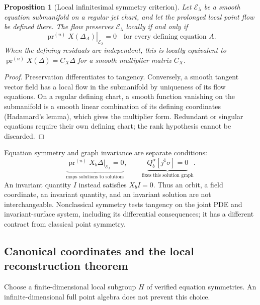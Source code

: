 \documentclass[11pt]{article}
\newtheorem{proposition}[theorem]{Proposition}
\theoremstyle{definition}
\newcommand{\pr}{\operatorname{pr}}
\begin{document}
\begin{proposition}[Local infinitesimal symmetry criterion]
\label{prop:infinitesimal-core}
Let $\mathcal E_\lambda$ be a smooth equation submanifold on a regular jet
chart, and let the prolonged local point flow be defined there. The flow
preserves $\mathcal E_\lambda$ locally if and only if
\begin{equation}
 \left.\pr^{(n)}X(\Delta_A)\right|_{\mathcal E_\lambda}=0
 \quad\text{for every defining equation }A.
 \label{eq:determining}
\end{equation}
When the defining residuals are independent, this is locally equivalent to
$\pr^{(n)}X(\Delta)=C_X\Delta$ for a smooth multiplier matrix $C_X$.
\end{proposition}
\begin{proof}
Preservation differentiates to tangency. Conversely, a smooth tangent vector
field has a local flow in the submanifold by uniqueness of its flow equations.
On a regular defining chart, a smooth function vanishing on the submanifold
is a smooth linear combination of its defining coordinates (Hadamard's lemma),
which gives the multiplier form. Redundant or singular equations require
their own defining chart; the rank hypothesis cannot be discarded.
\end{proof}

Equation symmetry and graph invariance are separate conditions:
\begin{equation}
 \underbrace{\pr^{(n)}X_b\Delta|_{\mathcal E_\lambda}=0}_{\text{maps solutions to solutions}},
 \qquad
 \underbrace{Q_b^\alpha[j^1\sigma]=0}_{\text{fixes this solution graph}}.
 \label{eq:fundamental-tangencies}
\end{equation}
An invariant quantity $I$ instead satisfies $X_bI=0$. Thus an orbit, a field
coordinate, an invariant quantity, and an invariant solution are not
interchangeable. Nonclassical symmetry tests tangency on the joint PDE and
invariant-surface system, including its differential consequences; it has a
different contract from classical point symmetry.

\subsection{Canonical coordinates and the local reconstruction theorem}
\label{sec:canonical-core}
Choose a finite-dimensional local subgroup $H$ of verified equation symmetries.
An infinite-dimensional full point algebra does not prevent this choice.
\end{document}
